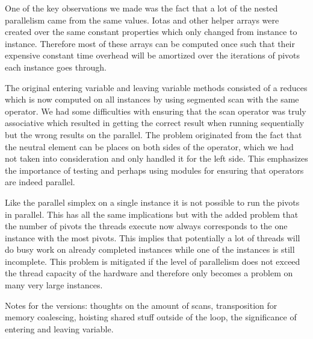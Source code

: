 One of the key observations we made was the fact that a lot of the nested parallelism came from the same values. Iotas and other helper arrays were created over the same constant properties which only changed from instance to instance. Therefore most of these arrays can be computed once such that their expensive constant time overhead will be amortized over the iterations of pivots each instance goes through.

The original entering variable and leaving variable methods consisted of a reduces which is now computed on all instances by using segmented scan with the same operator. We had some difficulties with ensuring that the scan operator was truly associative which resulted in getting the correct result when running sequentially but the wrong results on the parallel. The problem originated from the fact that the neutral element can be places on both sides of the operator, which we had not taken into consideration and only handled it for the left side. This emphasizes the importance of testing and perhaps using modules for ensuring that operators are indeed parallel.

Like the parallel simplex on a single instance it is not possible to run the pivots in parallel. This has all the same implications but with the added problem that the number of pivots the threads execute now always corresponds to the one instance with the most pivots. This implies that potentially a lot of threads will do busy work on already completed instances while one of the instances is still incomplete. This problem is mitigated if the level of parallelism does not exceed the thread capacity of the hardware and therefore only becomes a problem on many very large instances.

Notes for the versions: thoughts on the amount of scans, transposition for memory coalescing, hoisting shared stuff outside of the loop, the significance of entering and leaving variable.
